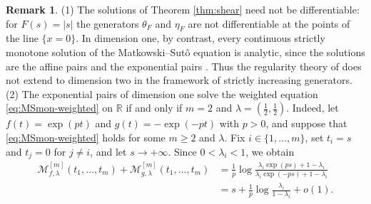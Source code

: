 \documentclass[a4paper, reqno, 11pt]{amsart}
\theoremstyle{definition}
\newtheorem{Rem}[Thm]{Remark}
\begin{document}
\begin{Rem}\label{rem:shear-features}
(1) The solutions of Theorem \ref{thm:shear} need not be differentiable: for $F(s) = |s|$ the generators $\theta_F$ and $\eta_F$ are not differentiable at the points of the line $\{x = 0\}$.
In dimension one, by contrast, every continuous strictly monotone solution of the Matkowski--Sut\^o equation is analytic, since the solutions are the affine pairs and the exponential pairs \cite{DP}.
Thus the regularity theory of \cite{DP} does not extend to dimension two in the framework of strictly increasing generators. \\
(2) The exponential pairs of dimension one solve the weighted equation \eqref{eq:MSmon-weighted} on $\mathbb{R}$ if and only if $m=2$ and $\lambda = (\tfrac{1}{2},\tfrac{1}{2})$.
Indeed, let $f(t) = \exp(pt)$ and $g(t) = -\exp(-pt)$ with $p>0$, and suppose that \eqref{eq:MSmon-weighted} holds for some $m\ge 2$ and $\lambda$.
Fix $i\in\{1,\dots,m\}$, set $t_i=s$ and $t_j=0$ for $j\neq i$, and let $s\to+\infty$.
Since $0<\lambda_i<1$, we obtain
\begin{align*}
\mathcal{M}^{[m]}_{f,\lambda}(t_1,\dots,t_m) +\mathcal{M}^{[m]}_{g,\lambda}(t_1,\dots,t_m) &= \frac{1}{p}\log\frac{\lambda_i \exp(ps)+1-\lambda_i}{\lambda_i \exp(-ps) +1-\lambda_i} \\
&= s+\frac{1}{p}\log\frac{\lambda_i}{1-\lambda_i}+o(1).
\end{align*}


\end{Rem}
\end{document}
